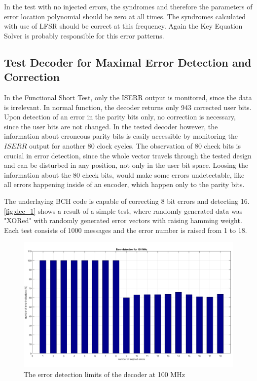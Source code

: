 In the test with no injected errors, the syndromes and therefore the parameters of error location polynomial should be zero at all times. The syndromes calculated with use of LFSR should be correct at this frequency. Again the Key Equation Solver is probably responsible for this error patterns.


\subsection{Test Decoder for Maximal Error Detection and Correction}

In the Functional Short Test, only the ISERR output is monitored, since the data is irrelevant. In normal function, the decoder returns only 943 corrected user bits. Upon detection of an error in the parity bits only, no correction is necessary, since the user bits are not changed. In the tested decoder however, the information about erroneous parity bits is easily accessible by monitoring the $ISERR$ output for another 80 clock cycles. The observation of 80 check bits is crucial in error detection, since the whole vector travels through the tested design and can be disturbed in any position, not only in the user bit space. Loosing the information about the 80 check bits, would make some errors undetectable, like all errors happening inside of an encoder, which happen only to the parity bits. 

The underlaying BCH code is capable of correcting 8 bit errors and detecting 16. \autoref{fig:dec_1} shows a result of a simple test, where randomly generated data was "XORed" with randomly generated error vectors with raising hamming weight. Each test consists of 1000 messages and the error number is raised from 1 to 18. 

\begin{figure}[h]
\centering
\includegraphics[width=\textwidth]{figures/max_detection_100.png}
\caption{The error detection limits of the decoder at 100 MHz}
\label{fig:dec_1}
\end{figure}

